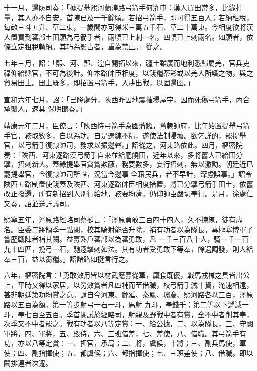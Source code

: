 \begin{pinyinscope}
 十一月，邊防司奏：「據提舉熙河蘭湟路弓箭手何灌申：漢人買田常多，比緣打量，其人亦不自安，首陳已及一千餘頃。若招弓箭手，即可得五百人；若納租稅，每畝三斗五升、草二束，一歲間亦可得米三萬五千石、草二十萬束。今相度欲將漢
 人置買到蕃部土田願為弓箭手者，兩頃已上刺一名，四頃已上刺兩名。如願者，依條立定租稅輸納。其巧為影占者，重為禁止。」從之。



 七年三月，詔：「熙、河、鄯、湟自開拓以來，疆土雖廣而地利悉歸屬羌，官兵吏祿仰給縣官，不可為後計。仰本路帥臣相度，以錢糧茶彩或以羌人所嗜之物，與之貿易田土。田土既多，即招置弓箭手，入耕出戰，以固邊圉。」



 宣和六年七月，詔：「已降處分，陜西昨因地震摧塌屋宇，因而死傷弓箭手，內合承襲人，速具
 保明聞奏。」



 靖康元年二月，臣僚言：「陜西恃弓箭手為國藩籬，舊隸帥府，比年始置提舉弓箭手官，務取數多，自以為功。自是選練不精，遂使法制浸壞。欲乞詳酌，罷提舉官，以弓箭手復隸帥司，務求以振邊聲。」詔從之，河東路依此。四月，樞密院奏：「陜西、河東逐路漢弓箭手自來並給肥饒田，近年以來，多將舊人已給田分擘，招刺新人。蓋緣提舉官貪賞欺蔽，務要數多，妄行招刺，無以激勸。朝廷近已罷提舉官，今復隸帥司所轄，況當今邊事
 全藉民兵，若不早計，深慮誤事。」詔令陜西五路制置使錢蓋及陜西、河東逐路帥臣相度措置，將已分擘弓箭手田土，依舊改正撥還，所有新招到人別行給地，務要均濟。仍仰帥臣嚴切奉行。是月，徐處仁又奏，詔並送詳議司。



 熙寧五年，涇原路經略司蔡挺言：「涇原勇敢三百四十四人，久不揀練，徒有虛名。臣委二將領季一點閱，校其騎射能否升除，補有功者以為隊長，募極塞博軍子嘗歷戰陣者補其闕。益募熟戶蕃部以為蕃勇敢，凡
 一千三百八十人，騎一千一百九十四匹，挽弓一石，馳逐擊刺如法。其有功者受勇敢下等奉，餘遇調發，則人給奉三百，益以芻糧。」詔諸路如挺言行之。



 六年，樞密院言：「勇敢效用皆以材武應募從軍，廩食既優，戰馬戎械之具皆出公上，平時又得以家居，以勞效賞者凡四補而至借職，校弓箭手減十資，淹速相遠，甚非朝廷第功均賞之意。請自今河東、鄜延、秦鳳、環慶、熙河路各以三百，涇原路以五百為額。第一等步射弓一石一斗，馬射
 九斗，奉錢千；第二等以下遞減一斗，奉七百至五百。季首閱試於經略司，射親及野戰中者有賞，全不中者削其奉，次季又不中者罷之。戰有功者以八等定賞：一、給公據，二、以為隊長，三、守闕軍將，四、軍將，五、殿侍，六、三班借差，七、差使，八、借職。其弓箭手有功，亦以八等定賞：一、押官，承局；二、將，虞候，十將；三、副兵馬使，軍使；四、副指揮使；五、都虞候；六、都指揮使；七、三班差使；八、借職。即以闕排連者次遷。




\end{pinyinscope}
